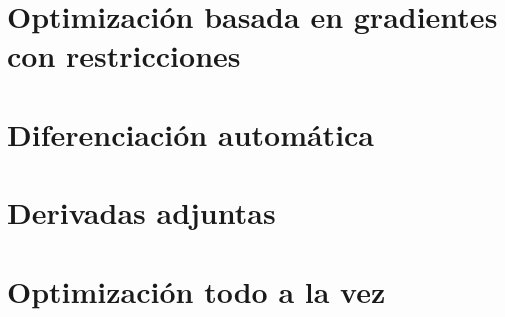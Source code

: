 \section{Optimización basada en gradientes con restricciones}
\label{sec:optimization}


\clearpage
\section{Diferenciación automática}


\clearpage
\section{Derivadas adjuntas}
\label{sec:adjoints}


\clearpage
\section{Optimización todo a la vez}
\label{sec:all_at_once}

